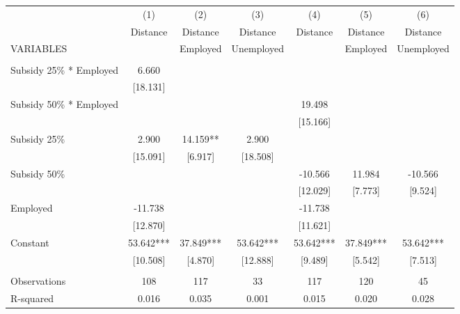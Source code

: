 \begin{tabular}{lcccccc} \hline
 & (1) & (2) & (3) & (4) & (5) & (6) \\
 & Distance & Distance & Distance & Distance & Distance & Distance \\
VARIABLES &  & Employed & Unemployed &  & Employed & Unemployed \\ \hline
 &  &  &  &  &  &  \\
Subsidy 25\% * Employed & 6.660 &  &  &  &  &  \\
 & [18.131] &  &  &  &  &  \\
Subsidy 50\% * Employed &  &  &  & 19.498 &  &  \\
 &  &  &  & [15.166] &  &  \\
Subsidy 25\% & 2.900 & 14.159** & 2.900 &  &  &  \\
 & [15.091] & [6.917] & [18.508] &  &  &  \\
Subsidy 50\% &  &  &  & -10.566 & 11.984 & -10.566 \\
 &  &  &  & [12.029] & [7.773] & [9.524] \\
Employed & -11.738 &  &  & -11.738 &  &  \\
 & [12.870] &  &  & [11.621] &  &  \\
Constant & 53.642*** & 37.849*** & 53.642*** & 53.642*** & 37.849*** & 53.642*** \\
 & [10.508] & [4.870] & [12.888] & [9.489] & [5.542] & [7.513] \\
 &  &  &  &  &  &  \\
Observations & 108 & 117 & 33 & 117 & 120 & 45 \\
 R-squared & 0.016 & 0.035 & 0.001 & 0.015 & 0.020 & 0.028 \\ \hline
\end{tabular}
